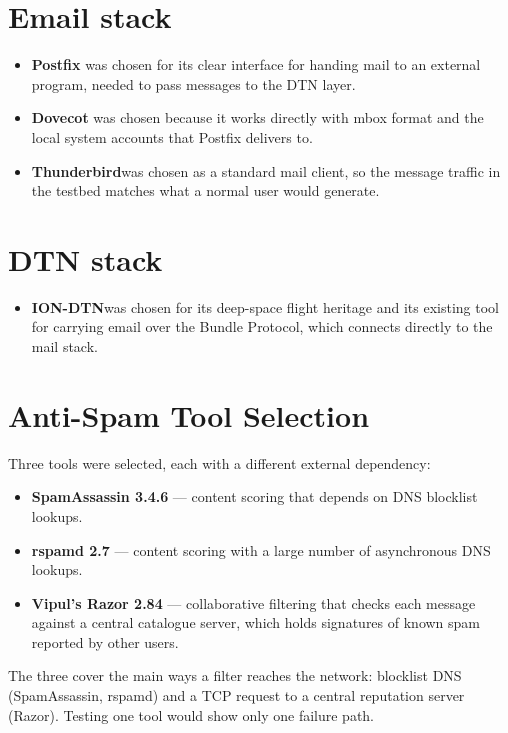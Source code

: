 \section{Email stack}
\begin{itemize}
  \item \textbf{Postfix} was chosen for its clear interface for handing mail to an external program, needed to pass messages to the DTN layer.
  \item \textbf{Dovecot} was chosen because it works directly with mbox format and the local system accounts that Postfix delivers to.
  \item \textbf{Thunderbird}was chosen as a standard mail client, so the message traffic in the testbed matches what a normal user would generate.
\end{itemize}

\section{DTN stack}
\begin{itemize}
  \item \textbf{ION-DTN}was chosen for its deep-space flight heritage and its existing tool for carrying email over the Bundle Protocol, which connects directly to the mail stack.
\end{itemize}

\section{Anti-Spam Tool Selection}
\label{sec:tools}

Three tools were selected, each with a different external dependency:

\begin{itemize}
  \item \textbf{SpamAssassin 3.4.6} --- content scoring that depends on DNS
  blocklist lookups.
  \item \textbf{rspamd 2.7} --- content scoring with a large number of
  asynchronous DNS lookups.
  \item \textbf{Vipul's Razor 2.84} --- collaborative filtering that checks each message against a central catalogue server, which holds signatures of known spam reported by other users.
\end{itemize}

The three cover the main ways a filter reaches the network: blocklist DNS (SpamAssassin, rspamd) and a TCP request to a central reputation server (Razor). Testing one tool would show only one failure path.


